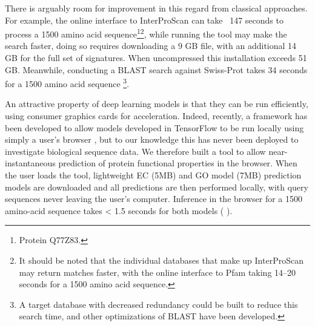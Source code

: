 There is arguably room for improvement in this regard from classical approaches. For example, the online interface to InterProScan can take ~147 seconds to process a 1500 amino acid sequence\footnote{Protein Q77Z83.}\footnote{It should be noted that the individual databases that make up InterProScan may return matches faster, with the online interface to Pfam taking 14--20 seconds for a 1500 amino acid sequence.}, while running the tool may make the search faster, doing so requires downloading a 9 GB file, with an additional 14 GB for the full set of signatures. When uncompressed this installation exceeds 51 GB. Meanwhile, conducting a BLAST search against Swiss-Prot takes 34 seconds for a 1500 amino acid sequence \footnote{A target database with decreased redundancy could be built to reduce this search time, and other optimizations of BLAST have been developed.}.

An attractive property of deep learning models is that they can be run efficiently, using consumer graphics cards for acceleration. Indeed, recently, a framework has been developed to allow models developed in TensorFlow to be run locally using simply a user's browser \citep{tfjs}, but to our knowledge this has never been deployed to investigate biological sequence data. We therefore built a tool to allow near-instantaneous prediction of protein functional properties in the browser. When the user loads the tool, lightweight EC (5MB) and GO model (7MB) prediction models are downloaded and all predictions are then performed locally, with query sequences never leaving the user's computer. Inference in the browser for a 1500 amino-acid sequence takes < 1.5 seconds for both models (%
).
